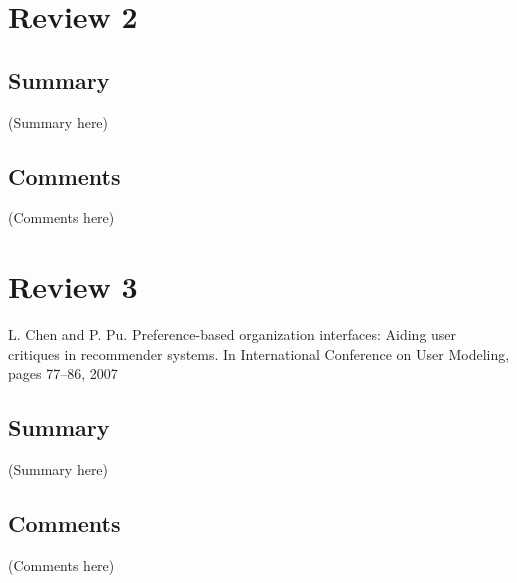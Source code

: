 \documentclass{article}
\begin{document}
\section*{Review 2}

\subsection*{Summary}
(Summary here)

\subsection*{Comments}
(Comments here)

\section*{Review 3}
L. Chen and P. Pu. Preference-based organization interfaces: Aiding user 
critiques in recommender systems. In International Conference on 
User Modeling, pages 77–86, 2007

\subsection*{Summary}
(Summary here)

\subsection*{Comments}
(Comments here)
\end{document}
